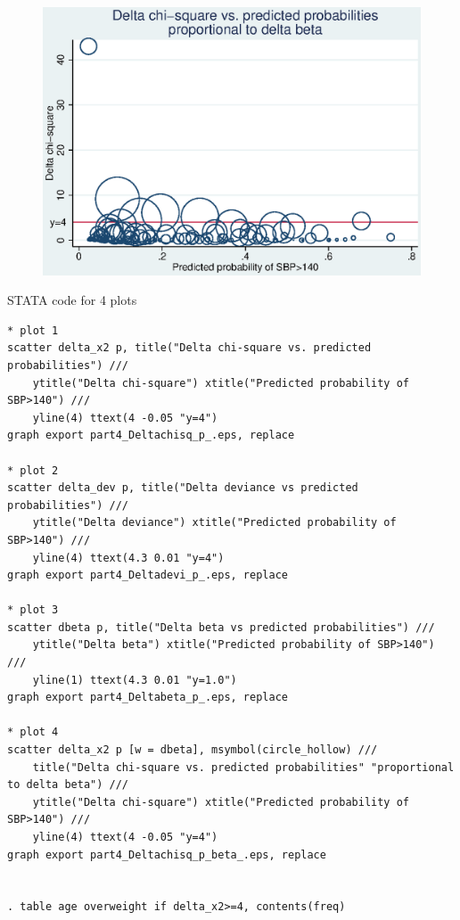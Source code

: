 \documentclass{article}
\begin{document}
\begin{enumerate}
    \begin{figure}
    \centering
    \includegraphics[width=\figwidths]{04/part4_Deltachisq_p_beta_.eps}
    \end{figure}

\pagebreak

      STATA code for 4 plots
      \begin{verbatim}
* plot 1
scatter delta_x2 p, title("Delta chi-square vs. predicted probabilities") ///
    ytitle("Delta chi-square") xtitle("Predicted probability of SBP>140") ///
    yline(4) ttext(4 -0.05 "y=4")
graph export part4_Deltachisq_p_.eps, replace

* plot 2
scatter delta_dev p, title("Delta deviance vs predicted probabilities") ///
    ytitle("Delta deviance") xtitle("Predicted probability of SBP>140") ///
    yline(4) ttext(4.3 0.01 "y=4")
graph export part4_Deltadevi_p_.eps, replace

* plot 3 
scatter dbeta p, title("Delta beta vs predicted probabilities") ///
    ytitle("Delta beta") xtitle("Predicted probability of SBP>140") ///
    yline(1) ttext(4.3 0.01 "y=1.0")
graph export part4_Deltabeta_p_.eps, replace

* plot 4
scatter delta_x2 p [w = dbeta], msymbol(circle_hollow) ///
    title("Delta chi-square vs. predicted probabilities" "proportional to delta beta") ///
    ytitle("Delta chi-square") xtitle("Predicted probability of SBP>140") ///
    yline(4) ttext(4 -0.05 "y=4")
graph export part4_Deltachisq_p_beta_.eps, replace


. table age overweight if delta_x2>=4, contents(freq)


\end{verbatim}
\end{enumerate}
\end{document}
